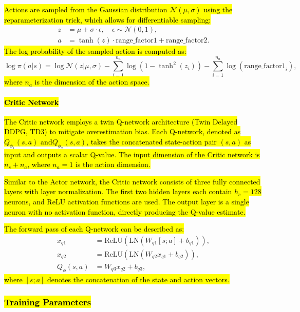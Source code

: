 \documentclass[preprint,12pt]{elsarticle}
\begin{document}
\hl{Actions are sampled from the Gaussian distribution $\mathcal{N}(\mu, \sigma)$ using the reparameterization trick, which allows for differentiable sampling:}
\[
\begin{align}
z &= \mu + \sigma \cdot \epsilon, \quad \epsilon \sim \mathcal{N}(0, 1), \\
a &= \tanh(z) \cdot \text{range\_factor1} + \text{range\_factor2}.
\end{align}
\]
\hl{The log probability of the sampled action is computed as:}
\begin{equation}
\log\pi(a|s) = \log\mathcal{N}(z|\mu, \sigma) - \sum_{i=1}^{n_a} \log(1 - \tanh^2(z_i)) - \sum_{i=1}^{n_a} \log(\text{range\_factor1}_i),
\end{equation}
\hl{where $n_a$ is the dimension of the action space.}

\paragraph{\hl{Critic Network}}
\hl{The Critic network employs a twin Q-network architecture (Twin Delayed DDPG, TD3) to mitigate overestimation bias. Each Q-network, denoted as $Q_{\phi_1}(s,a)$ and$Q_{\phi_2}(s,a)$, takes the concatenated state-action pair $(s,a)$ as input and outputs a scalar Q-value. The input dimension of the Critic network is $n_s + n_a$, where $n_a = 1$ is the action dimension.}

\hl{Similar to the Actor network, the Critic network consists of three fully connected layers with layer normalization. The first two hidden layers each contain $h_c = 128$ neurons, and ReLU activation functions are used. The output layer is a single neuron with no activation function, directly producing the Q-value estimate.}

\hl{The forward pass of each Q-network can be described as:}
\[
\begin{align}
x_{q1} &= \text{ReLU}(\text{LN}(W_{q1} [s; a] + b_{q1})), \\
x_{q2} &= \text{ReLU}(\text{LN}(W_{q2} x_{q1} + b_{q2})), \\
Q_{\phi}(s,a) &= W_{q3} x_{q2} + b_{q3},
\end{align}
\]
\hl{where $[s; a]$ denotes the concatenation of the state and action vectors.}

\subsubsection{\hl{Training Parameters}}
\end{document}
